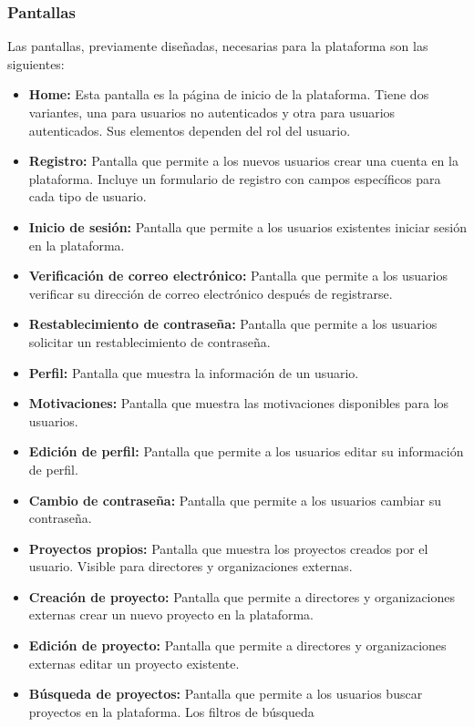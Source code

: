 \subsubsection{Pantallas}
Las pantallas, previamente diseñadas, necesarias para la plataforma son las siguientes:
\begin{itemize}
    \item \textbf{Home:} Esta pantalla es la página de inicio de la plataforma. Tiene dos variantes, una para usuarios no autenticados
            y otra para usuarios autenticados. Sus elementos dependen del rol del usuario.
    \item \textbf{Registro:} Pantalla que permite a los nuevos usuarios crear una cuenta en la plataforma. Incluye un formulario de
            registro con campos específicos para cada tipo de usuario.
    \item \textbf{Inicio de sesión:} Pantalla que permite a los usuarios existentes iniciar sesión en la plataforma.
    \item \textbf{Verificación de correo electrónico:} Pantalla que permite a los usuarios verificar su dirección de correo
            electrónico después de registrarse.
    \item \textbf{Restablecimiento de contraseña:} Pantalla que permite a los usuarios solicitar un restablecimiento de contraseña.
    \item \textbf{Perfil:} Pantalla que muestra la información de un usuario.
    \item \textbf{Motivaciones:} Pantalla que muestra las motivaciones disponibles para los usuarios.
    \item \textbf{Edición de perfil:} Pantalla que permite a los usuarios editar su información de perfil.
    \item \textbf{Cambio de contraseña:} Pantalla que permite a los usuarios cambiar su contraseña.
    \item \textbf{Proyectos propios:} Pantalla que muestra los proyectos creados por el usuario. Visible para directores y
        organizaciones externas.
    \item \textbf{Creación de proyecto:} Pantalla que permite a directores y organizaciones externas crear un nuevo proyecto en la
        plataforma.
    \item \textbf{Edición de proyecto:} Pantalla que permite a directores y organizaciones externas editar un proyecto existente.
    \item \textbf{Búsqueda de proyectos:} Pantalla que permite a los usuarios buscar proyectos en la plataforma. Los filtros de búsqueda

\end{itemize}
